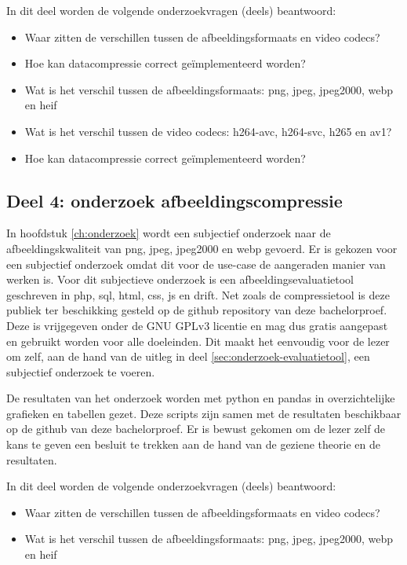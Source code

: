 In dit deel worden de volgende onderzoekvragen (deels) beantwoord: 
\begin{itemize}
	\item Waar zitten de verschillen tussen de \glspl{afbeeldingsformaat} en video \glspl{codec}?
	\item Hoe kan \gls{datacompressie} correct geïmplementeerd worden?
	\item Wat is het verschil tussen de \glspl{afbeeldingsformaat}: \gls{png}, \gls{jpeg}, \gls{jpeg2000}, \gls{webp} en \gls{heif}
	\item Wat is het verschil tussen de video \glspl{codec}: \gls{h264-avc}, \gls{h264-svc}, \gls{h265} en \gls{av1}?
	\item Hoe kan \gls{datacompressie} correct geïmplementeerd worden?
\end{itemize}

\subsection{Deel 4: onderzoek afbeeldingscompressie}
\label{sec:aanpak-bachelorproef-deel-4}

In hoofdstuk \ref{ch:onderzoek} wordt een subjectief onderzoek naar de afbeeldingskwaliteit van \gls{png}, \gls{jpeg}, \gls{jpeg2000} en \gls{webp} gevoerd. Er is gekozen voor een subjectief onderzoek omdat dit voor de \gls{use-case} de aangeraden manier van werken is. Voor dit subjectieve onderzoek is een \gls{afbeeldingsevaluatietool} geschreven in \gls{php}, \gls{sql}, \gls{html}, \gls{css}, \gls{js} en \gls{drift}. Net zoals de \gls{compressietool} is deze publiek ter beschikking gesteld op de \gls{github} repository van deze bachelorproef. Deze is vrijgegeven onder de GNU GPLv3 licentie en mag dus gratis aangepast en gebruikt worden voor alle doeleinden. Dit maakt het eenvoudig voor de lezer om zelf, aan de hand van de uitleg in deel \ref{sec:onderzoek-evaluatietool}, een subjectief onderzoek te voeren.

De resultaten van het onderzoek worden met \gls{python} en \gls{pandas} in overzichtelijke grafieken en tabellen gezet. Deze scripts zijn samen met de resultaten beschikbaar op de \gls{github} van deze bachelorproef. Er is bewust gekomen om de lezer zelf de kans te geven een besluit te trekken aan de hand van de geziene theorie en de resultaten.


In dit deel worden de volgende onderzoekvragen (deels) beantwoord: 
\begin{itemize}
	\item Waar zitten de verschillen tussen de \glspl{afbeeldingsformaat} en video \glspl{codec}?
	\item Wat is het verschil tussen de \glspl{afbeeldingsformaat}: \gls{png}, \gls{jpeg}, \gls{jpeg2000}, \gls{webp} en \gls{heif}
\end{itemize}

